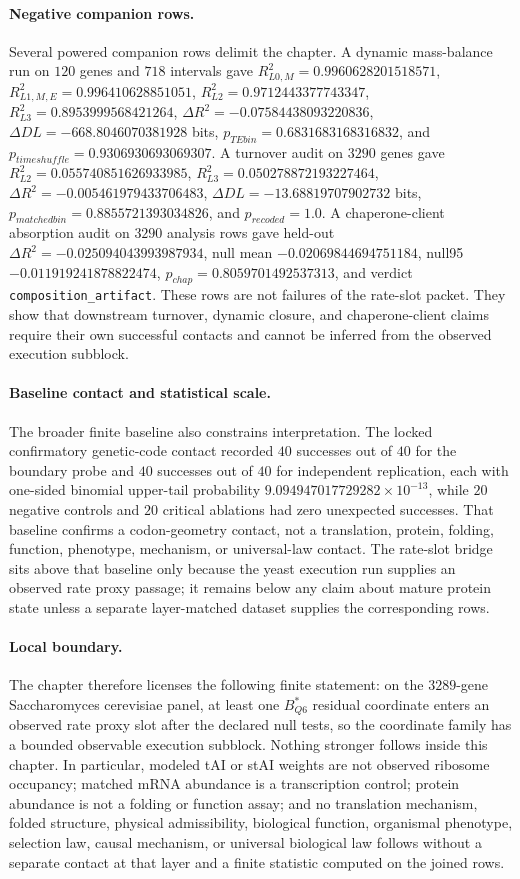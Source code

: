\paragraph{Negative companion rows.}
Several powered companion rows delimit the chapter. A dynamic mass-balance run on $120$ genes and $718$ intervals gave $R^2_{L0,M}=0.9960628201518571$, $R^2_{L1,M,E}=0.996410628851051$, $R^2_{L2}=0.9712443377743347$, $R^2_{L3}=0.8953999568421264$, $\Delta R^2=-0.07584438093220836$, $\Delta DL=-668.8046070381928$ bits, $p_{TEbin}=0.6831683168316832$, and $p_{timeshuffle}=0.9306930693069307$. A turnover audit on $3290$ genes gave $R^2_{L2}=0.055740851626933985$, $R^2_{L3}=0.050278872193227464$, $\Delta R^2=-0.005461979433706483$, $\Delta DL=-13.68819707902732$ bits, $p_{matchedbin}=0.8855721393034826$, and $p_{recoded}=1.0$. A chaperone-client absorption audit on $3290$ analysis rows gave held-out $\Delta R^2=-0.025094043993987934$, null mean $-0.02069844694751184$, null95 $-0.011919241878822474$, $p_{chap}=0.8059701492537313$, and verdict \texttt{composition\_artifact}. These rows are not failures of the rate-slot packet. They show that downstream turnover, dynamic closure, and chaperone-client claims require their own successful contacts and cannot be inferred from the observed execution subblock.

\paragraph{Baseline contact and statistical scale.}
The broader finite baseline also constrains interpretation. The locked confirmatory genetic-code contact recorded $40$ successes out of $40$ for the boundary probe and $40$ successes out of $40$ for independent replication, each with one-sided binomial upper-tail probability $9.094947017729282\times 10^{-13}$, while $20$ negative controls and $20$ critical ablations had zero unexpected successes. That baseline confirms a codon-geometry contact, not a translation, protein, folding, function, phenotype, mechanism, or universal-law contact. The rate-slot bridge sits above that baseline only because the yeast execution run supplies an observed rate proxy passage; it remains below any claim about mature protein state unless a separate layer-matched dataset supplies the corresponding rows.

\paragraph{Local boundary.}
The chapter therefore licenses the following finite statement: on the $3289$-gene Saccharomyces cerevisiae panel, at least one $B^{\ast}_{Q6}$ residual coordinate enters an observed rate proxy slot after the declared null tests, so the coordinate family has a bounded observable execution subblock. Nothing stronger follows inside this chapter. In particular, modeled tAI or stAI weights are not observed ribosome occupancy; matched mRNA abundance is a transcription control; protein abundance is not a folding or function assay; and no translation mechanism, folded structure, physical admissibility, biological function, organismal phenotype, selection law, causal mechanism, or universal biological law follows without a separate contact at that layer and a finite statistic computed on the joined rows.